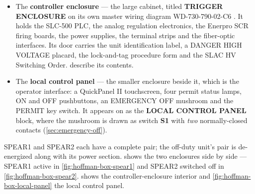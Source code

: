 \begin{itemize}
\tightlist
\item
  The \textbf{controller enclosure} --- the large cabinet, titled \textbf{TRIGGER ENCLOSURE} on its own master wiring diagram WD-730-790-02-C6 . It holds the SLC-500 PLC, the analog regulation electronics, the Enerpro SCR firing boards, the power supplies, the terminal strips and the fiber-optic interfaces. Its door carries the unit identification label, a DANGER HIGH VOLTAGE placard, the lock-and-tag procedure form and the SLAC HV Switching Order.  describe its contents.
\item
  The \textbf{local control panel} --- the smaller enclosure beside it, which is the operator interface: a QuickPanel II touchscreen, four permit status lamps, ON and OFF pushbuttons, an EMERGENCY OFF mushroom and the PERMIT key switch. It appears on  as the \textbf{LOCAL CONTROL PANEL} block, where the mushroom is drawn as switch \textbf{S1} with \emph{two} normally-closed contacts (\cref{sec:emergency-off}).
\end{itemize}

SPEAR1 and SPEAR2 each have a complete pair; the off-duty unit's pair is de-energized along with its power section.  shows the two enclosures side by side --- SPEAR1 active in \cref{fig:hoffman-box-spear1} and SPEAR2 switched off in \cref{fig:hoffman-box-spear2}.  shows the controller-enclosure interior and \cref{fig:hoffman-box-local-panel} the local control panel.

